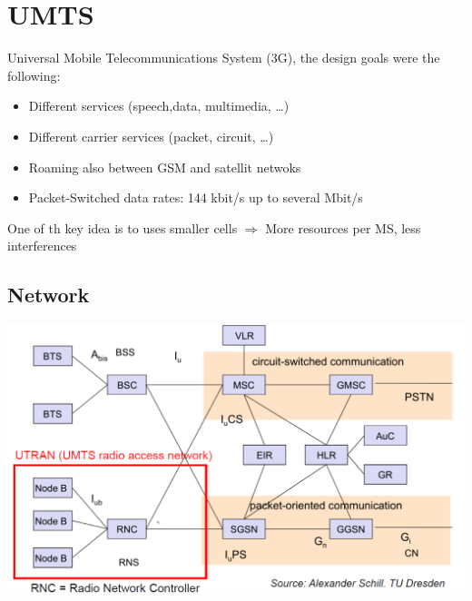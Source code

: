 
\section{UMTS}
Universal Mobile Telecommunications System (3G), the design goals were the following:
\begin{itemize}
	\item Different services (speech,data, multimedia, \ldots)
	\item Different carrier services (packet, circuit, \ldots)
	\item Roaming also between GSM and satellit netwoks
	\item Packet-Switched data rates: 144 kbit/s up to several
	Mbit/s
\end{itemize}

One of th key idea is to uses smaller cells $\Rightarrow$ More resources per MS,
less interferences

\subsection{Network}
\begin{center}
    \includegraphics[scale=0.5]{img/umts.png}
\end{center}

